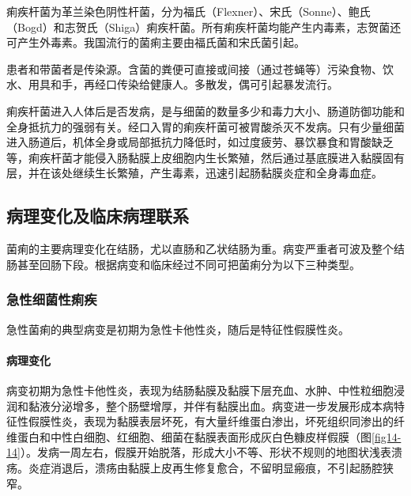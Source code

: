 痢疾杆菌为革兰染色阴性杆菌，分为福氏（Flexner）、宋氏（Sonne）、鲍氏（Bogd）和志贺氏（Shiga）痢疾杆菌。所有痢疾杆菌均能产生内毒素，志贺菌还可产生外毒素。我国流行的菌痢主要由福氏菌和宋氏菌引起。

患者和带菌者是传染源。含菌的粪便可直接或间接（通过苍蝇等）污染食物、饮水、用具和手，再经口传染给健康人。多散发，偶可引起暴发流行。

痢疾杆菌进入人体后是否发病，是与细菌的数量多少和毒力大小、肠道防御功能和全身抵抗力的强弱有关。经口入胃的痢疾杆菌可被胃酸杀灭不发病。只有少量细菌进入肠道后，机体全身或局部抵抗力降低时，如过度疲劳、暴饮暴食和胃酸缺乏等，痢疾杆菌才能侵入肠黏膜上皮细胞内生长繁殖，然后通过基底膜进入黏膜固有层，并在该处继续生长繁殖，产生毒素，迅速引起肠黏膜炎症和全身毒血症。

\subsection{病理变化及临床病理联系}

菌痢的主要病理变化在结肠，尤以直肠和乙状结肠为重。病变严重者可波及整个结肠甚至回肠下段。根据病变和临床经过不同可把菌痢分为以下三种类型。

\subsubsection{急性细菌性痢疾}

急性菌痢的典型病变是初期为急性卡他性炎，随后是特征性假膜性炎。

\paragraph{病理变化}
病变初期为急性卡他性炎，表现为结肠黏膜及黏膜下层充血、水肿、中性粒细胞浸润和黏液分泌增多，整个肠壁增厚，并伴有黏膜出血。病变进一步发展形成本病特征性假膜性炎，表现为黏膜表层坏死，有大量纤维蛋白渗出，坏死组织同渗出的纤维蛋白和中性白细胞、红细胞、细菌在黏膜表面形成灰白色糠皮样假膜（图\ref{fig14-14}）。发病一周左右，假膜开始脱落，形成大小不等、形状不规则的地图状浅表溃疡。炎症消退后，溃疡由黏膜上皮再生修复愈合，不留明显瘢痕，不引起肠腔狭窄。

